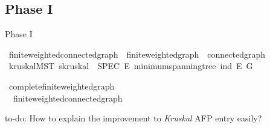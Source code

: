 \documentclass[%
	sans,
	12pt,
]{beamer}
\def\isacartoucheopen{}%
\def\isacartoucheclose{}%
\begin{document}
\subsection{Phase I}%
\begin{frame}{Phase I}

\begin{isabelle}
	\isamarkupfalse%
	\ finite{\isacharunderscore}weighted{\isacharunderscore}connected{\isacharunderscore}graph\ {\isacharequal}\ finite{\isacharunderscore}weighted{\isacharunderscore}graph\ {\isacharplus}\ connected{\isacharunderscore}graph\isanewline
	\isanewline
	\isanewline
	\ \ \isamarkupfalse%
	\ kruskal{}{\isacharunderscore}MST{\isacharcolon}\ {\isacartoucheopen}s{\isachardot}kruskal{}\ {\isasymle}\ SPEC\ {\isacharparenleft}{\isasymlambda}E{\isacharprime}{\isachardot}\ minimum{\isacharunderscore}spanning{\isacharunderscore}tree\ {\isacharparenleft}ind\ E{\isacharprime}{\isacharparenright}\ G{\isacharparenright}{\isacartoucheclose}
	\isanewline
	\isanewline
	\isamarkupfalse%
\end{isabelle}\pause%

\begin{isabelle}
	\isamarkupfalse%
	\ complete{\isacharunderscore}finite{\isacharunderscore}weighted{\isacharunderscore}graph\ {\isasymsubseteq}\\ \ \ finite{\isacharunderscore}weighted{\isacharunderscore}connected{\isacharunderscore}graph
	\end{isabelle}
to-do: How to explain the improvement to \textit{Kruskal} AFP entry easily?
\end{frame}
\end{document}
